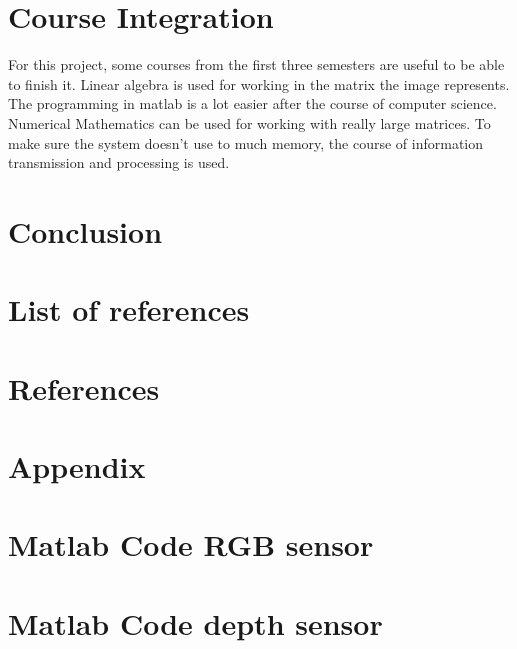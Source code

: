 \documentclass[11pt]{article}
\begin{document}
\section{Course Integration}
For this project, some courses from the first three semesters are useful to be able to finish it. Linear algebra is used for working in the matrix the image represents. The programming in matlab is a lot easier after the course of computer science. Numerical Mathematics can be used for working with really large matrices. To make sure the system doesn't use to much memory, the course of information transmission and processing is used.

\section{Conclusion}

\section{List of references}
\section{References}

\nocite{*}



\section{Appendix}




\section*{Matlab Code RGB sensor}




\section*{Matlab Code depth sensor}


\end{document}
